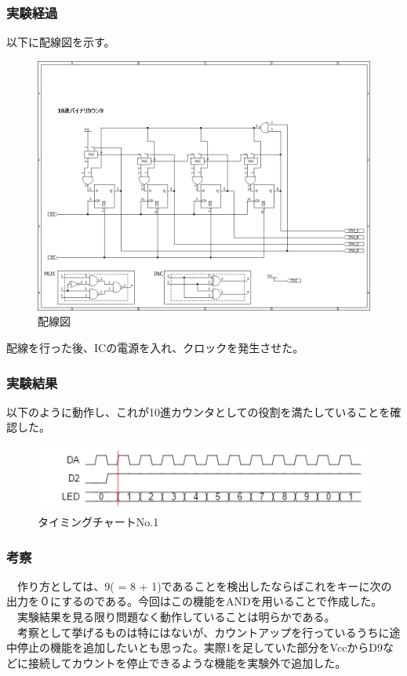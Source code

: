 \documentclass{scrartcl}
\begin{document}
\subsubsection{実験経過}
\label{sec:org951f4c3}
以下に配線図を示す。\\
\begin{figure}[htbp]
\centering
\includegraphics[width=.9\linewidth]{./logice-1.png}
\caption{\label{fig:org16b6468}
配線図}
\end{figure}
配線を行った後、ICの電源を入れ、クロックを発生させた。\\

\subsubsection{実験結果}
\label{sec:org22eb5f4}
以下のように動作し、これが10進カウンタとしての役割を満たしていることを確認した。\\
\begin{figure}[htbp]
\centering
\includegraphics[width=.9\linewidth]{./logictime-1.png}
\caption{\label{fig:org8a22957}
タイミングチャートNo.1}
\end{figure}

\subsubsection{考察}
\label{sec:orgdd68073}
　作り方としては、9( = 8 + 1)であることを検出したならばこれをキーに次の出力を０にするのである。今回はこの機能をANDを用いることで作成した。\\
　実験結果を見る限り問題なく動作していることは明らかである。\\
　考察として挙げるものは特にはないが、カウントアップを行っているうちに途中停止の機能を追加したいとも思った。実際1を足していた部分をVccからD9などに接続してカウントを停止できるような機能を実験外で追加した。\\
\end{document}
